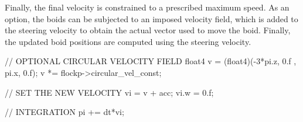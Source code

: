 Finally, the final velocity is constrained to a prescribed maximum speed. As an option, the boids can be subjected to an imposed velocity field, which is added to the steering velocity to obtain the actual vector used to move the boid. Finally, the updated boid positions are computed using the steering velocity.

\begin{cppcode}{0}
// OPTIONAL CIRCULAR VELOCITY FIELD
float4 v = (float4)(-3*pi.z, 0.f , pi.x, 0.f);
v *= flockp->circular_vel_const;

// SET THE NEW VELOCITY
vi = v + acc;
vi.w = 0.f;

// INTEGRATION
pi += dt*vi; 
\end{cppcode}
 


